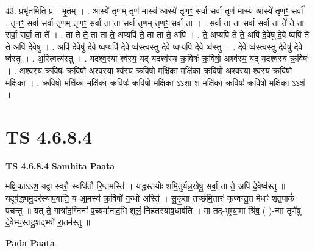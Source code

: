 \documentclass[17pt]{extarticle}
\begin{document}
43. प्रभृ॑त॒मिति॒ प्र - भृ॒त॒म् । . आ॒स्ये॑ तृण॒म् तृण॑ मा॒स्य॑ आ॒स्ये॑ तृणꣳ॒॒ सर्वा॒ सर्वा॒ तृण॑ मा॒स्य॑ आ॒स्ये॑ तृणꣳ॒॒ सर्वा᳚ । . तृणꣳ॒॒ सर्वा॒ सर्वा॒ तृण॒म् तृणꣳ॒॒ सर्वा॒ ता ता सर्वा॒ तृण॒म् तृणꣳ॒॒ सर्वा॒ ता । . सर्वा॒ ता ता सर्वा॒ सर्वा॒ ता ते॑ ते॒ ता सर्वा॒ सर्वा॒ ता ते᳚ । . ता ते॑ ते॒ ता ता ते॒ अप्यपि॑ ते॒ ता ता ते॒ अपि॑ । . ते॒ अप्यपि॑ ते ते॒ अपि॑ दे॒वेषु॑ दे॒वे ष्वपि॑ ते ते॒ अपि॑ दे॒वेषु॑ । . अपि॑ दे॒वेषु॑ दे॒वे ष्वप्यपि॑ दे॒वे ष्व॑स्त्वस्तु दे॒वे ष्वप्यपि॑ दे॒वे ष्व॑स्तु । . दे॒वे ष्व॑स्त्वस्तु दे॒वेषु॑ दे॒वे ष्व॑स्तु । . अ॒स्त्वित्य॑स्तु । . यदश्व॒स्या श्व॑स्य॒ यद् यदश्व॑स्य क्र॒विषः॑ क्र॒विषो॒ अश्व॑स्य॒ यद् यदश्व॑स्य क्र॒विषः॑ । . अश्व॑स्य क्र॒विषः॑ क्र॒विषो॒ अश्व॒स्या श्व॑स्य क्र॒विषो॒ मक्षि॑का॒ मक्षि॑का क्र॒विषो॒ अश्व॒स्या श्व॑स्य क्र॒विषो॒ मक्षि॑का । . क्र॒विषो॒ मक्षि॑का॒ मक्षि॑का क्र॒विषः॑ क्र॒विषो॒ मक्षि॒का ऽऽशा श॒ मक्षि॑का क्र॒विषः॑ क्र॒विषो॒ मक्षि॒का ऽऽश॑ । \newline
\pagebreak
{}

\section{ TS 4.6.8.4 }

\textbf{TS 4.6.8.4 } \newline
\textbf{Samhita Paata} \newline

मक्षि॒काऽऽश॒ यद्वा॒ स्वरौ॒ स्वधि॑तौ रि॒प्तमस्ति॑ । यद्धस्त॑योः शमि॒तुर्यन्न॒खेषु॒ सर्वा॒ ता ते॒ अपि॑ दे॒वेष्व॑स्तु ॥ यदूव॑द्ध्यमु॒दर॑स्याप॒वाति॒ य आ॒मस्य॑ क्र॒विषो॑ ग॒न्धो अस्ति॑ । सु॒कृ॒ता तच्छ॑मि॒तारः॑ कृण्वन्तू॒त मेधꣳ॑ शृत॒पाकं॑ पचन्तु ॥ यत् ते॒ गात्रा॑द॒ग्निना॑ प॒च्यमा॑नाद॒भि शूलं॒ निह॑तस्याव॒धाव॑ति । मा तद्-भूम्या॒मा श्रि॑ष॒ ( )-न्मा तृणे॑षु दे॒वेभ्य॒स्तदु॒शद्भ्यो॑ रा॒तम॑स्तु ॥ \newline

\textbf{Pada Paata} \newline
\end{document}
